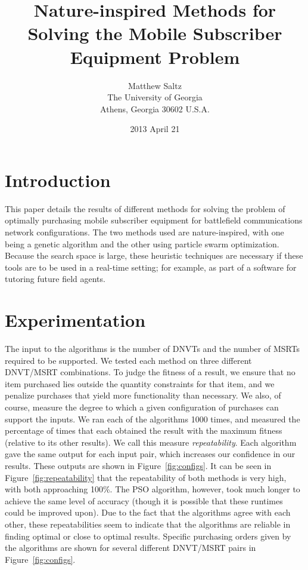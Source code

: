 \documentclass[12pt,fleqn]{article}
\title{\bf Nature-inspired Methods for Solving the Mobile Subscriber Equipment Problem}
\author{Matthew Saltz \\
        The University of Georgia \\
        Athens, Georgia 30602 U.S.A.}
\date{2013 April 21}
\begin{document}
\maketitle
\section{Introduction}
This paper details the results of different methods for solving the problem of optimally purchasing
mobile subscriber equipment for battlefield communications network configurations.  
The two methods used are nature-inspired, with one being a genetic algorithm and the 
other using particle swarm optimization.  Because the search space is large, these
heuristic techniques are necessary if these tools are to be used in a real-time setting;
for example, as part of a software for tutoring future field agents.  
\section{Experimentation}    
The input to the algorithms is the number of DNVTs and the number of MSRTs required to be supported. We tested each method on three different DNVT/MSRT combinations. To judge the fitness of a result, we ensure that no item purchased lies outside the quantity constraints for that item, and we penalize purchases that yield more functionality than necessary.  We also, of course, measure the degree to which a given configuration of purchases can support the inputs. We ran each of the
algorithms 1000 times, and measured the percentage of times that each obtained the result with the maximum fitness (relative to its other results). We call this measure {\em repeatability}. Each algorithm gave the same output for each input pair, which increases our confidence in our results. These outputs are shown in Figure~\ref{fig:configs}. It can be seen in Figure~\ref{fig:repeatability} that the repeatability of both methods is very high, with both approaching 100\%. The PSO algorithm, however, took much longer to achieve the same level of accuracy (though it is possible that these runtimes could be improved upon).  Due to the fact that the algorithms agree with each other, these repeatabilities seem
to indicate that the algorithms are reliable in finding optimal or close to optimal results. Specific purchasing orders given by the algorithms are shown for several different DNVT/MSRT pairs in Figure~\ref{fig:configs}. 
\end{document}
